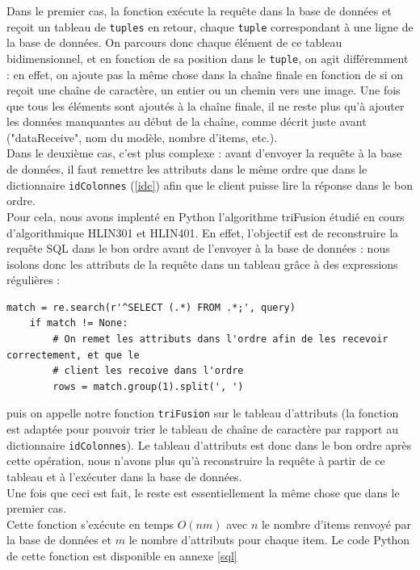 \documentclass[twoside]{report}
\begin{document}
Dans le premier cas, la fonction exécute la requête dans la base de données et reçoit un tableau de \verb!tuples! en retour, chaque \verb!tuple! correspondant à une ligne de la base de données. On parcours donc chaque élément de ce tableau bidimensionnel, et en fonction de sa position dans le \verb!tuple!, on agit différemment : en effet, on ajoute pas la même chose dans la chaîne finale en fonction de si on reçoit une chaîne de caractère, un entier ou un chemin vers une image. Une fois que tous les éléments sont ajoutés à la chaîne finale, il ne reste plus qu'à ajouter les données manquantes au début de la chaîne, comme décrit juste avant ("dataReceive", nom du modèle, nombre d'items, etc.). \\

Dans le deuxième cas, c'est plus complexe : avant d'envoyer la requête à la base de données, il faut remettre les attributs dans le même ordre que dans le dictionnaire \verb!idColonnes! (\ref{idc}) afin que le client puisse lire la réponse dans le bon ordre. \\
Pour cela, nous avons implenté en Python l'algorithme triFusion étudié en cours d'algorithmique HLIN301 et HLIN401. En effet, l'objectif est de reconstruire la requête SQL dans le bon ordre avant de l'envoyer à la base de données : nous isolons donc les attributs de la requête dans un tableau grâce à des expressions régulières :
\begin{lstlisting}[style=py, caption=serveur.py : expressions régulières, label=re]
    match = re.search(r'^SELECT (.*) FROM .*;', query)
    if match != None:
        # On remet les attributs dans l'ordre afin de les recevoir correctement, et que le
        # client les recoive dans l'ordre
        rows = match.group(1).split(', ')
\end{lstlisting}
puis on appelle notre fonction \verb!triFusion! sur le tableau d'attributs (la fonction est adaptée pour pouvoir trier le tableau de chaîne de caractère par rapport au dictionnaire \verb!idColonnes!). Le tableau d'attributs est donc dans le bon ordre après cette opération, nous n'avons plus qu'à reconstruire la requête à partir de ce tableau et à l'exécuter dans la base de données. \\
Une fois que ceci est fait, le reste est essentiellement la même chose que dans le premier cas. \\

Cette fonction s'exécute en temps $O(nm)$ avec $n$ le nombre d'items renvoyé par la base de données et $m$ le nombre d'attributs pour chaque item. Le code Python de cette fonction est disponible en annexe \ref{sql}
\end{document}
